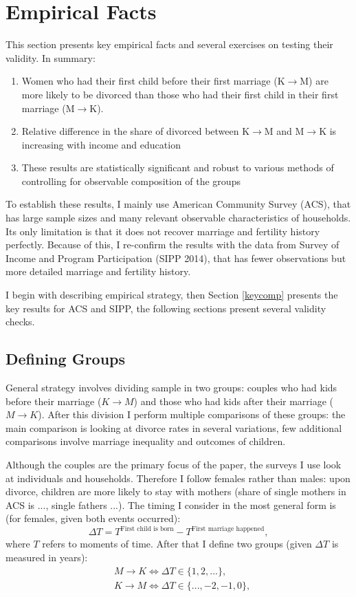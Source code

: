 \documentclass[12pt,letter]{article}
\begin{document}
\section{Empirical Facts}

This section presents key empirical facts and several exercises on testing their validity. In summary:
\begin{enumerate}
\item Women who had their first child before their first marriage (K$\to$M) are more likely to be divorced than those who had their first child in their first marriage (M$\to$K).
\item Relative difference in the share of divorced between K$\to$M and M$\to$K is increasing with income and education
\item These results are statistically significant and robust to various methods of controlling for observable composition of the groups
\end{enumerate}

To establish these results, I mainly use American Community Survey (ACS), that has large sample sizes and many relevant observable characteristics of households. Its only limitation is that it does not recover marriage and fertility history perfectly. Because of this, I re-confirm the results with the data from Survey of Income and Program Participation (SIPP 2014), that has fewer observations but more detailed marriage and fertility history.

I begin with describing empirical strategy, then Section \ref{keycomp} presents the key results for ACS and SIPP, the following sections present several validity checks.

\subsection{Defining Groups}

General strategy involves dividing sample in two groups: couples who had kids before their marriage ($K\to M$) and those who had kids after their marriage ($M\to K$). After this division I perform multiple comparisons of these groups: the main comparison is looking at divorce rates in several variations, few additional comparisons involve marriage inequality and outcomes of children.

Although the couples are the primary focus of the paper, the surveys I use look at individuals and households. Therefore I follow females rather than males: upon divorce, children are more likely to stay with mothers (share of single mothers in ACS is ..., single fathers ...). The timing I consider in the  most general form is (for females, given both events occurred): 
\[\Delta T = T^{\text{First child  is born}} - T^{\text{First marriage happened}},\]
where $T$ refers to moments of time. After that I define two groups (given $\Delta T$ is measured in years):
\begin{align*}&M\to K \Leftrightarrow \Delta T \in \{1,2,...\},\\
&K\to M \Leftrightarrow \Delta T \in \{...,-2,-1,0\},\end{align*}
\end{document}
